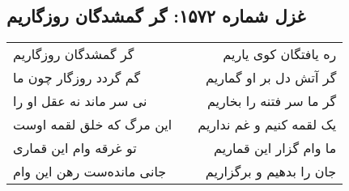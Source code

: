 \begin{center}
\section*{غزل شماره ۱۵۷۲: گر گمشدگان روزگاریم}
\label{sec:1572}
\begin{longtable}{l p{0.5cm} r}
گر گمشدگان روزگاریم
&&
ره یافتگان کوی یاریم
\\
گم گردد روزگار چون ما
&&
گر آتش دل بر او گماریم
\\
نی سر ماند نه عقل او را
&&
گر ما سر فتنه را بخاریم
\\
این مرگ که خلق لقمه اوست
&&
یک لقمه کنیم و غم نداریم
\\
تو غرقه وام این قماری
&&
ما وام گزار این قماریم
\\
جانی مانده‌ست رهن این وام
&&
جان را بدهیم و برگزاریم
\\
\end{longtable}
\end{center}
